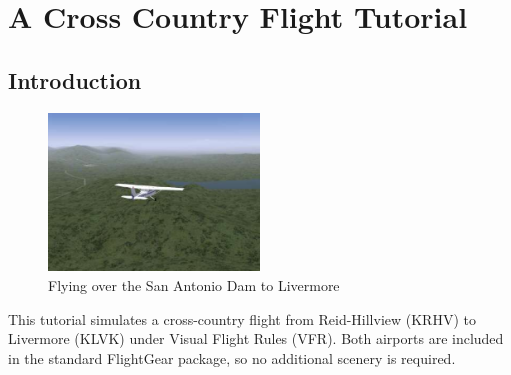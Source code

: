 
\chapter{A Cross Country Flight Tutorial\label{crosscountry}}

\section{Introduction}

\begin{figure}[!htp]
\centering
\includegraphics[width=0.5\textwidth]{antonio2}
\caption{Flying over the San Antonio Dam to Livermore}
\end{figure}

This tutorial simulates a cross-country flight from Reid-Hillview (KRHV) to Livermore (KLVK) under Visual Flight Rules (VFR). Both airports are included in the standard FlightGear package, so no additional scenery is required.

